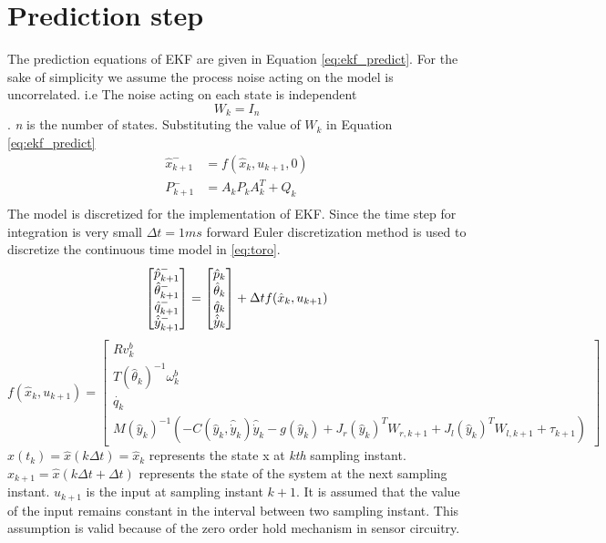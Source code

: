 \section{Prediction step}
The prediction equations of EKF are given in Equation \ref{eq:ekf_predict}. For the sake of simplicity we assume the process noise acting on the model is uncorrelated. i.e The noise acting on each state is independent $$W_k = I_{n}$$. \emph{n} is the number of states. Substituting the value of $W_k$ in Equation \ref{eq:ekf_predict}
\begin{equation}
\label{eq:predict}
\begin{split}
\hat{x}_{k+1}^- &= f(\hat{x}_{k},u_{k+1},0)\\
P_{k+1}^- &= A_kP_{k}A_k^T + Q_{k}\\
\end{split}
\end{equation}
The model is discretized for the implementation of EKF. Since the time step for integration is very small $\Delta t = 1ms$ forward Euler discretization method is used to discretize the continuous time model in \ref{eq:toro}.
\begin{equation}
\label{eq:toro_dis}
	\begin{bmatrix}
	\hat{p}_{k+1}^- \\ \hat{\theta}_{k+1}^- \\ \hat{q}_{k+1}^- \\ \hat{\dot{y}}_{k+1}^-
	\end{bmatrix}
	 =   
	 \begin{bmatrix}
	 \hat{p}_k \\ \hat{\theta}_k \\ \hat{q}_k \\ \hat{\dot{y}}_{k}
	\end{bmatrix}	  
	+ \Delta t f(\hat{x}_k,u_{k+1}) \\
\end{equation}
$$ f(\hat{x}_k,u_{k+1}) = 
	\begin{bmatrix}
	R v^b_k\\	
	T(\hat{\theta}_k)^{-1} \omega_k^b\\
	\dot{q_k}\\
	M(\hat{y}_{k})^{-1}(-C(\hat{y}_{k},\hat{\dot{y}}_{k})\hat{\dot{y}}_{k} -g(\hat{y}_{k}) +  J_r(\hat{y}_{k})^{T}W_{r,k+1} +J_l(\hat{y}_{k})^{T}W_{l,k+1} + \tau_{k+1})	
	\end{bmatrix} $$
$\hat{x}(t_k) = \hat{x}(k \Delta t) = \hat{x}_k$ represents the state x at \emph{kth} sampling instant. $\hat{x}_{k+1} = \hat{x}(k \Delta t + \Delta t)$ represents the state of the system at the next sampling instant. $u_{k+1}$ is the input at sampling instant $k+1$. It is assumed that the value of the input remains constant in the interval between two sampling instant. This assumption is valid because of the zero order hold mechanism in sensor circuitry.

